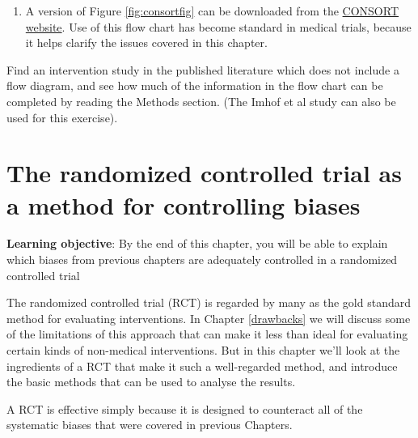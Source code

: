 \documentclass{krantz}
\providecommand{\tightlist}{%
\setlength{\itemsep}{0pt}\setlength{\parskip}{0pt}}
\begin{document}
\begin{enumerate}
\def\labelenumi{\arabic{enumi}.}
\setcounter{enumi}{1}
\tightlist
\item
  A version of Figure \ref{fig:consortfig} can be downloaded from the \href{http://www.consort-statement.org/consort-statement/flow-diagram}{CONSORT website}. Use of this flow chart has become standard in medical trials, because it helps clarify the issues covered in this chapter.
\end{enumerate}

Find an intervention study in the published literature which does not include a flow diagram, and see how much of the information in the flow chart can be completed by reading the Methods section. (The Imhof et al study can also be used for this exercise).

\hypertarget{RCT}{%
\chapter{The randomized controlled trial as a method for controlling biases}\label{RCT}}

\textbf{Learning objective}: By the end of this chapter, you will be able to explain which biases from previous chapters are adequately controlled in a randomized controlled trial

The randomized controlled trial (RCT) is regarded by many as the gold standard method for evaluating interventions. In Chapter \ref{drawbacks} we will discuss some of the limitations of this approach that can make it less than ideal for evaluating certain kinds of non-medical interventions. But in this chapter we'll look at the ingredients of a RCT that make it such a well-regarded method, and introduce the basic methods that can be used to analyse the results.

A RCT is effective simply because it is designed to counteract all of the systematic biases that were covered in previous Chapters.
\end{document}
